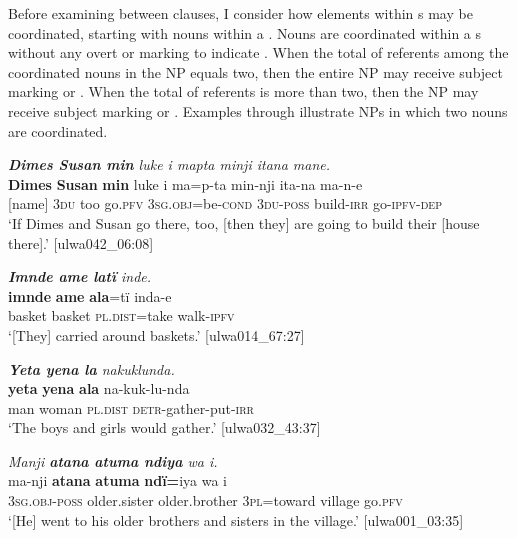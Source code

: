 Before examining  between clauses, I consider how elements within s may be coordinated, starting with nouns within a . Nouns are coordinated within a s without any overt  or  marking to indicate . When the total  of referents among the coordinated nouns in the NP equals two, then the entire NP may receive  subject marking or . When the total  of referents is more than two, then the NP may receive  subject marking or . Examples  through  illustrate NPs in which two nouns are coordinated.

\ea%
    \label{ex:complex:1}
            \textit{\textbf{Dimes Susan min} luke i mapta minji itana mane.}\\
\gll    \textbf{Dimes}  \textbf{Susan}  \textbf{min}  luke  i    ma=p-ta      min-nji ita-na    ma-n-e\\
    [name]  [name]  3\textsc{du}  too    go.\textsc{pfv}  \textsc{3sg.obj}=be\textsc{{}-cond}  \textsc{3du-poss}    build-\textsc{irr}  go\textsc{{}-ipfv-dep}\\
\glt `If Dimes and Susan go there, too, [then they] are going to build their [house there].’ [ulwa042\_06:08]
\z

\ea%
    \label{ex:complex:2}
           \textit{\textbf{Imnde ame latï} inde.}\\
\gll    \textbf{imnde}    \textbf{ame}    \textbf{ala}=tï      inda-e\\
    basket  basket  \textsc{pl.dist}=take  walk-\textsc{ipfv}\\
\glt `[They] carried around baskets.’ [ulwa014\_67:27]
\z

\ea%
    \label{ex:complex:3}
            \textit{\textbf{Yeta yena la} nakuklunda.}\\
\gll    \textbf{yeta}  \textbf{yena}  \textbf{ala}      na-kuk-lu-nda\\
    man  woman  \textsc{pl.dist}  \textsc{detr-}gather-put-\textsc{irr}\\
\glt `The boys and girls would gather.’ [ulwa032\_43:37]
\z

\ea%
    \label{ex:complex:4}
            \textit{Manji \textbf{atana atuma ndiya} wa i.}\\
\gll    ma-nji      \textbf{atana}    \textbf{atuma}      \textbf{ndï=}iya    wa i\\
    3\textsc{sg.obj-poss}  older.sister  older.brother  3\textsc{pl}=toward  village    go.\textsc{pfv}\\
\glt `[He] went to his older brothers and sisters in the village.’ [ulwa001\_03:35]
\z

